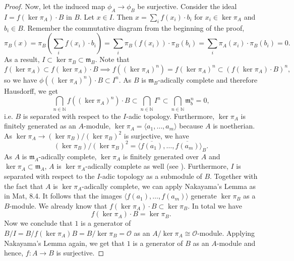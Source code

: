 \documentclass{article}
\theoremstyle{plain}%
\theoremstyle{definition}
\theoremstyle{remark}
\begin{document}
\begin{proof}
    Now, let the induced map \(\phi_A \to \phi_B\) be surjective. 
    Consider the ideal \(I = f(\ker \pi_A) \cdot B\) in \(B\).
    Let \(x \in I\). Then \(x = \sum_i f(x_i) \cdot b_i\) for \(x_i \in \ker \pi_A\) and \(b_i \in B\).
    Remember the commutative diagram from the beginning of the proof,
    \[
        \pi_B(x) = \pi_B\left(\sum_i f(x_i)\cdot b_i\right) 
        = \sum_i \pi_B(f(x_i))\cdot \pi_B(b_i) 
        = \sum_i\pi_A(x_i)\cdot \pi_B(b_i) = 0. 
    \]
    As a result, \(I \subset \ker \pi_B \subset \mathfrak{m}_B\).
    Note that
    \[
        f(\ker \pi_A) \subset f(\ker \pi_A)\cdot B \implies f((\ker \pi_A)^n) 
        = f(\ker \pi_A)^n \subset (f(\ker \pi_A)\cdot B)^n,
    \]
    so we have \(\phi((\ker \pi_A)^n)\cdot B \subset I^n\).
    As \(B\) is \(\mathfrak{m}_B\)-adically complete and therefore Hausdorff, we get
    \[
        \bigcap_{n \in \mathbb N} f((\ker \pi_A)^n) \cdot B \subset \bigcap_{n \in \mathbb N} I^n 
        \subset \bigcap_{n \in \mathbb N} \mathfrak{m}_b^n = 0,
    \]
    i.e. \(\!B\) is separated with respect to the \(I\)-adic topology.
    Furthermore, \(\ker \pi_A\) is finitely generated as an \(A\)-module, 
    \(\ker \pi_A = \langle a_1, \dots, a_m\rangle\) because \(A\) is noetherian. 
    As \(\ker \pi_A \to (\ker \pi_B)/(\ker \pi_B)^2\) is surjective, we have 
    \[(\ker \pi_B)/(\ker \pi_B)^2 = \langle \overline{f(a_1)}, \dots, \overline{f(a_m)}\rangle_B.\]
    As \(A\) is \(\mathfrak{m}_A\)-adically complete, \(\ker \pi_A\) is finitely generated over \(A\)
    and \(\ker \pi_A \subset \mathfrak{m}_A\), \(A\) is \(\ker \pi_A\)-adically complete as well
    (see \cite[\href{https://stacks.math.columbia.edu/tag/090T}{lemma 10.96.8}]{stacks-project}).
    Furthermore, \(I\) is separated with respect to the \(I\)-adic topology 
    as a submodule of \(B\). Together with the fact that \(A\) is \(\ker \pi_A\)-adically complete,
    we can apply Nakayama's Lemma as in Mat, 8.4. 
    It follows that the images \(\langle f(a_1), \dots, f(a_m)\rangle\) generate \(\ker \pi_B\)
    as a \(B\)-module. We already know that \(f(\ker \pi_A) \cdot B \subset \ker \pi_B\). 
    In total we have
    \[
        f(\ker \pi_A) \cdot B = \ker \pi_B.
    \]
    Now we conclude that \(1\) is a generator of \(B/I = B/f(\ker \pi_A) B = B/\ker \pi_B = \mathcal{O}\) as an 
    \(A/\ker \pi_A \cong \mathcal{O}\)-module.
    Applying Nakayama's Lemma again, we get that \(1\) is a generator of \(B\) as an \(A\)-module 
    and hence, \(f\colon A \to B\) is surjective.
\end{proof}
\end{document}
